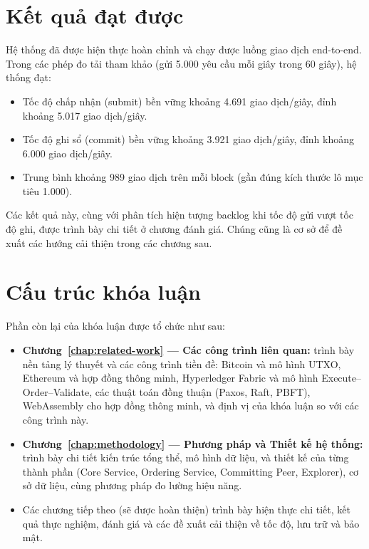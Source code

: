 \section{Kết quả đạt được}
\label{sec:results-summary}

Hệ thống đã được hiện thực hoàn chỉnh và chạy được luồng giao dịch
end-to-end. Trong các phép đo tải tham khảo (gửi 5.000 yêu cầu mỗi giây trong
60 giây), hệ thống đạt:

\begin{itemize}
  \item Tốc độ chấp nhận (submit) bền vững khoảng 4.691 giao dịch/giây, đỉnh
  khoảng 5.017 giao dịch/giây.
  \item Tốc độ ghi sổ (commit) bền vững khoảng 3.921 giao dịch/giây, đỉnh khoảng
  6.000 giao dịch/giây.
  \item Trung bình khoảng 989 giao dịch trên mỗi block (gần đúng kích thước lô
  mục tiêu 1.000).
\end{itemize}

Các kết quả này, cùng với phân tích hiện tượng backlog khi tốc độ gửi vượt tốc
độ ghi, được trình bày chi tiết ở chương đánh giá. Chúng cũng là cơ sở để đề
xuất các hướng cải thiện trong các chương sau.

\section{Cấu trúc khóa luận}
\label{sec:thesis-structure}

Phần còn lại của khóa luận được tổ chức như sau:

\begin{itemize}
  \item \textbf{Chương~\ref{chap:related-work} --- Các công trình liên quan:}
  trình bày nền tảng lý thuyết và các công trình tiền đề: Bitcoin và mô hình
  UTXO, Ethereum và hợp đồng thông minh, Hyperledger Fabric và mô hình
  Execute--Order--Validate, các thuật toán đồng thuận (Paxos, Raft, PBFT),
  WebAssembly cho hợp đồng thông minh, và định vị của khóa luận so với các công
  trình này.

  \item \textbf{Chương~\ref{chap:methodology} --- Phương pháp và Thiết kế hệ
  thống:} trình bày chi tiết kiến trúc tổng thể, mô hình dữ liệu, và thiết kế
  của từng thành phần (Core Service, Ordering Service, Committing Peer,
  Explorer), cơ sở dữ liệu, cùng phương pháp đo lường hiệu năng.

  \item Các chương tiếp theo (sẽ được hoàn thiện) trình bày hiện thực chi tiết,
  kết quả thực nghiệm, đánh giá và các đề xuất cải thiện về tốc độ, lưu trữ và
  bảo mật.
\end{itemize}
